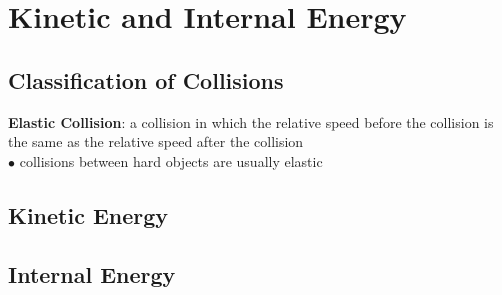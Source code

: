 \section{Kinetic and Internal Energy}

    \subsection{Classification of Collisions}

        \textbf{Elastic Collision}: a collision in which the relative speed before the collision is the same as the relative speed after the collision \\
        $\bullet$ collisions between hard objects are usually elastic \\









    \subsection{Kinetic Energy}
    \subsection{Internal Energy}
